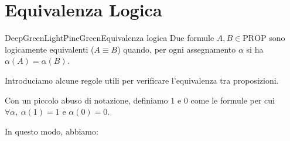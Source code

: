 \documentclass[a4paper,11pt]{report}
\begin{document}
\newpage
\section{Equivalenza Logica}

\begin{cdefframe}{DeepGreenLight}{PineGreen}{Equivalenza logica}{}
    Due formule \( A, B \in \text{PROP} \) sono logicamente equivalenti (\( A \equiv B \)) quando, per ogni assegnamento \( \alpha \) si ha \( \alpha(A) = \alpha(B) \).
\end{cdefframe}


Introduciamo alcune regole utili per verificare l'equivalenza tra proposizioni.

Con un piccolo abuso di notazione, definiamo \( 1 \) e \( 0 \) come le formule per cui \( \forall \alpha, \ \alpha(1)= 1 \) e \( \alpha(0) = 0 \).

In questo modo, abbiamo:
\end{document}

